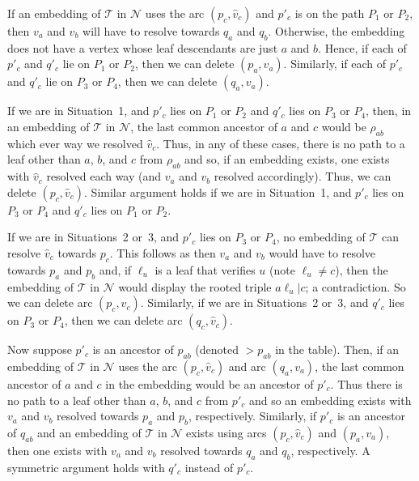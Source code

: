 \documentclass[11pt]{amsart}
\begin{document}
If an embedding of ${{\mathcal T}}$ in ${{\mathcal N}}$ uses the arc $(p_c,\hat v_c)$ and $p'_c$ is on the path $P_1$ or $P_2$, then $v_a$ and $v_b$ will have to resolve towards $q_a$ and $q_b$. Otherwise, the embedding does not have a vertex whose leaf descendants are just $a$ and $b$. Hence, if each of $p'_c$ and $q'_c$ lie on $P_1$ or $P_2$, then we can delete $(p_a, v_a)$. Similarly, if each of $p'_c$ and $q'_c$ lie on $P_3$ or $P_4$, then we can delete $(q_a, v_a)$.

If we are in Situation~1, and $p'_c$ lies on $P_1$ or $P_2$ and $q'_c$ lies on $P_3$ or $P_4$, then, in an embedding of ${{\mathcal T}}$ in ${{\mathcal N}}$, the last common ancestor of $a$ and $c$ would be $\rho_{ab}$ which ever way we resolved $\hat v_c$. Thus, in any of these cases, there is no path to a leaf other than $a$, $b$, and $c$ from $\rho_{ab}$ and so, if an embedding exists, one exists with $\hat v_c$ resolved each way (and $v_a$ and $v_b$ resolved accordingly). Thus, we can delete $(p_c, \hat v_c)$. Similar argument holds if we are in Situation~1, and $p'_c$ lies on $P_3$ or $P_4$ and $q'_c$ lies on $P_1$ or $P_2$.

If we are in Situations~2 or~3, and $p'_c$ lies on $P_3$ or $P_4$, no embedding of ${{\mathcal T}}$ can resolve $\hat v_c$ towards $p_c$. This follows as then $v_a$ and $v_b$ would have to resolve towards $p_a$ and $p_b$ and, if $\ell_u$ is a leaf that verifies $u$ (note $\ell_u\neq c$), then the embedding of ${{\mathcal T}}$ in ${{\mathcal N}}$ would display the rooted triple $a\ell_u|c$; a contradiction. So we can delete arc $(p_c,\hat v_c)$. Similarly, if we are in Situations~2 or~3, and $q'_c$ lies on $P_3$ or $P_4$, then we can delete arc $(q_c, \hat v_c)$.

Now suppose $p'_c$ is an ancestor of $p_{ab}$ (denoted $>p_{ab}$ in the table). Then, if an embedding of ${{\mathcal T}}$ in ${{\mathcal N}}$ uses the arc $(p_c,\hat v_c)$ and arc $(q_a,v_a)$, the last common ancestor of $a$ and $c$ in the embedding would be an ancestor of $p'_c$. Thus there is no path to a leaf other than $a$, $b$, and $c$ from $p'_c$ and so an embedding exists with  $v_a$ and $v_b$ resolved towards $p_a$ and $p_b$, respectively. Similarly, if $p'_c$ is an ancestor of $q_{ab}$ and an embedding of ${{\mathcal T}}$ in ${{\mathcal N}}$ exists using arcs $(p_c, \hat v_c)$ and $(p_a, v_a)$, then one exists with $v_a$ and $v_b$ resolved towards $q_a$ and $q_b$, respectively. A symmetric argument holds with $q'_c$ instead of $p'_c$.
\end{document}
